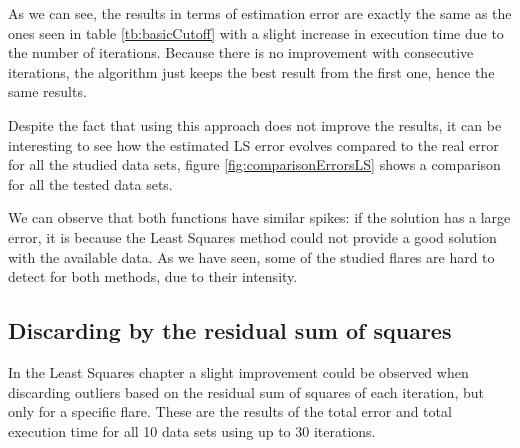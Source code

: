 As we can see, the results in terms of estimation error are exactly the same as the ones seen in table \ref{tb:basicCutoff} with a slight increase in execution time due to the number of iterations. Because there is no improvement with consecutive iterations, the algorithm just keeps the best result from the first one, hence the same results.

Despite the fact that using this approach does not improve the results, it can be interesting to see how the estimated LS error evolves compared to the real error for all the studied data sets, figure \ref{fig:comparisonErrorsLS} shows a comparison for all the tested data sets.


We can observe that both functions have similar spikes: if the solution has a large error, it is because the Least Squares method could not provide a good solution with the available data. As we have seen, some of the studied flares are hard to detect for both methods, due to their intensity.

\subsection{Discarding by the residual sum of squares}

In the Least Squares chapter a slight improvement could be observed when discarding outliers based on the residual sum of squares of each iteration, but only for a specific flare. These are the results of the total error and total execution time for all 10 data sets using up to 30 iterations.

